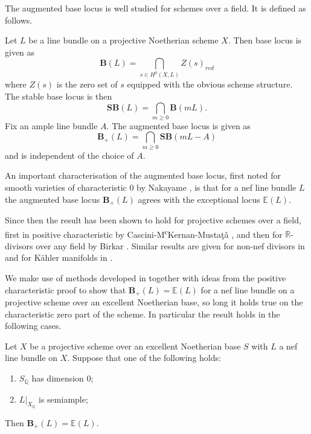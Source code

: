 \documentclass[a4paper,12pt]{book}
\newcommand{\SB}{\mathbf{SB}}
\newcommand{\BB}{\mathbf{B}}
\newcommand{\BS}{\mathbf{B}_{+}}
\begin{document}
	The augmented base locus is well studied for schemes over a field. It is defined as follows.
	
	\begin{definition}
		Let $L$ be a line bundle on a projective Noetherian scheme $X$. Then base locus is given as 
		$$\BB(L)= \bigcap_{s \in H^{0}(X,L)} Z(s)_{red}$$
		where $Z(s)$ is the zero set of $s$ equipped with the obvious scheme structure. The stable base locus is then
		$$\SB(L)=\bigcap_{m \geq 0}\BB(mL).$$
		Fix an ample line bundle $A$. The augmented base locus is given as 
		$$\BS(L)=\bigcap_{m \geq 0}\SB(mL-A)$$
		and is independent of the choice of $A$.
		
	\end{definition} 
	
	An important characterisation of the augmented base locus, first noted for smooth varieties of characteristic $0$ by Nakayame \cite{nakamaye2000stable}, is that for a nef line bundle $L$ the augmented base locus $\BS(L)$ agrees with the exceptional locus $\mathbb{E}(L)$. 
	
	Since then the result has been shown to hold for projective schemes over a field, first in positive characteristic by Cascini-M\textsuperscript{c}Kernan-Musta\c{t}\v{a} \cite{cascini2014augmented}, and then for $\mathbb{R}$-divisors over any field by Birkar \cite{birkar2017augmented}. Similar results are given for non-nef divisors in \cite{ein2009restricted} and for K\"{a}hler manifolds in \cite{collins2015kahler}.
	
	We make use of methods developed in \cite{witaszek2020keels} together with ideas from the positive characteristic proof to show that $\BS(L)=\mathbb{E}(L)$ for a nef line bundle on a projective scheme over an excellent Noetherian base, so long it holds true on the characteristic zero part of the scheme. In particular the result holds in the following cases.
	
	\begin{theorem}
		Let $X$ be a projective scheme over an excellent Noetherian base $S$ with $L$ a nef line bundle on $X$. 
		Suppose that one of the following holds:
		\begin{enumerate}
			\item $S_{\mathbb{Q}}$ has dimension $0$;
			\item $L|_{X_{\mathbb{Q}}}$ is semiample;
		\end{enumerate}
		
		Then $\BS(L)=\mathbb{E}(L)$.
	\end{theorem}
	
\end{document}
